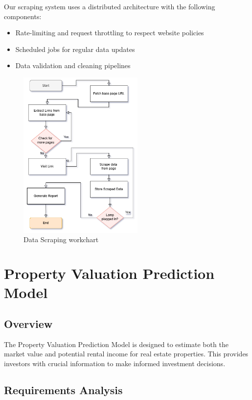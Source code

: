 Our scraping system uses a distributed architecture with the following components:
\begin{itemize}
    \item Rate-limiting and request throttling to respect website policies
    \item Scheduled jobs for regular data updates
    \item Data validation and cleaning pipelines
\end{itemize}
\newpage
\begin{figure}[htbp]
    \centering
    \includegraphics[width=0.55\textwidth]{images/workchartscraper.png}
    \caption{Data Scraping workchart}
    \label{fig:scraping-workchart}
\end{figure}



\section{Property Valuation Prediction Model}
\subsection{Overview}
The Property Valuation Prediction Model is designed to estimate both the market value and potential rental income for real estate properties. This provides investors with crucial information to make informed investment decisions.
\newpage
\subsection{Requirements Analysis}
